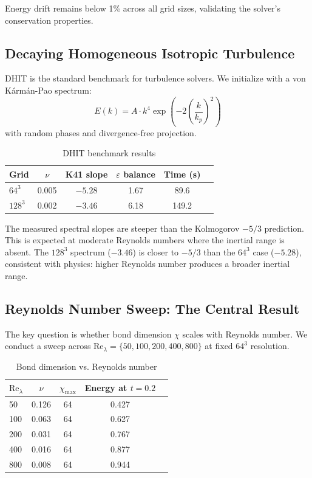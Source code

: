 \documentclass[11pt,a4paper]{article}
\theoremstyle{definition}
\begin{document}
Energy drift remains below 1\% across all grid sizes, validating the solver's conservation properties.

\subsection{Decaying Homogeneous Isotropic Turbulence}

DHIT is the standard benchmark for turbulence solvers.
We initialize with a von Kármán-Pao spectrum:
\begin{equation}
E(k) = A \cdot k^4 \exp\left(-2\left(\frac{k}{k_p}\right)^2\right)
\end{equation}
with random phases and divergence-free projection.

\begin{table}[htbp]
\centering
\caption{DHIT benchmark results}
\label{tab:dhit}
\begin{tabular}{lccccc}
\toprule
Grid & $\nu$ & K41 slope & $\varepsilon$ balance & Time (s) \\
\midrule
$64^3$ & 0.005 & $-5.28$ & 1.67 & 89.6 \\
$128^3$ & 0.002 & $-3.46$ & 6.18 & 149.2 \\
\bottomrule
\end{tabular}
\end{table}

The measured spectral slopes are steeper than the Kolmogorov $-5/3$ prediction.
This is expected at moderate Reynolds numbers where the inertial range is absent.
The $128^3$ spectrum ($-3.46$) is closer to $-5/3$ than the $64^3$ case ($-5.28$), consistent with physics: higher Reynolds number produces a broader inertial range.

\subsection{Reynolds Number Sweep: The Central Result}

The key question is whether bond dimension $\chi$ scales with Reynolds number.
We conduct a sweep across $\text{Re}_\lambda = \{50, 100, 200, 400, 800\}$ at fixed $64^3$ resolution.

\begin{table}[htbp]
\centering
\caption{Bond dimension vs. Reynolds number}
\label{tab:reynolds}
\begin{tabular}{lcccc}
\toprule
$\text{Re}_\lambda$ & $\nu$ & $\chi_{\max}$ & Energy at $t=0.2$ \\
\midrule
50 & 0.126 & 64 & 0.427 \\
100 & 0.063 & 64 & 0.627 \\
200 & 0.031 & 64 & 0.767 \\
400 & 0.016 & 64 & 0.877 \\
800 & 0.008 & 64 & 0.944 \\
\bottomrule
\end{tabular}
\end{table}
\end{document}
